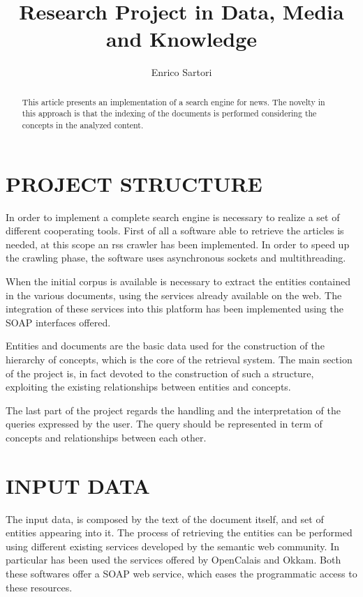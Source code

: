 \documentclass{acm_proc_article-sp-sigmod07}
\begin{document}
\title{Research Project in Data, Media and Knowledge}
\author{Enrico Sartori}

\maketitle

\begin{abstract}
This article presents an implementation of a search engine for news. The
novelty in this approach is that the indexing of the documents is
performed considering the concepts in the analyzed content.
\end{abstract}

\section{PROJECT STRUCTURE}
In order to implement a complete search engine is necessary to realize a
set of different cooperating tools.
First of all a software able to retrieve the articles is needed, at this
scope an rss crawler has been implemented.
In order to speed up the crawling phase, the software uses asynchronous
sockets and multithreading.

When the initial corpus is available is necessary to extract the entities
contained in the various documents, using the services already available
on the web. The integration of these services into this platform has been
implemented using the SOAP interfaces offered.

Entities and documents are the basic data used for the construction of the
hierarchy of concepts, which is the core of the retrieval system.
The main section of the project is, in fact devoted to the construction of
such a structure, exploiting the existing relationships between entities
and concepts.

The last part of the project regards the handling and the interpretation
of the queries expressed by the user. The query should be represented in
term of concepts and relationships between each other.

\section{INPUT DATA}
The input data, is composed by the text of the document itself, and set of
entities appearing into it.
The process of retrieving the entities can be performed using different
existing services developed by the semantic web community.
In particular has been used the services offered by OpenCalais and Okkam.
Both these softwares offer a SOAP web service, which eases the
programmatic access to these resources.
\end{document}
